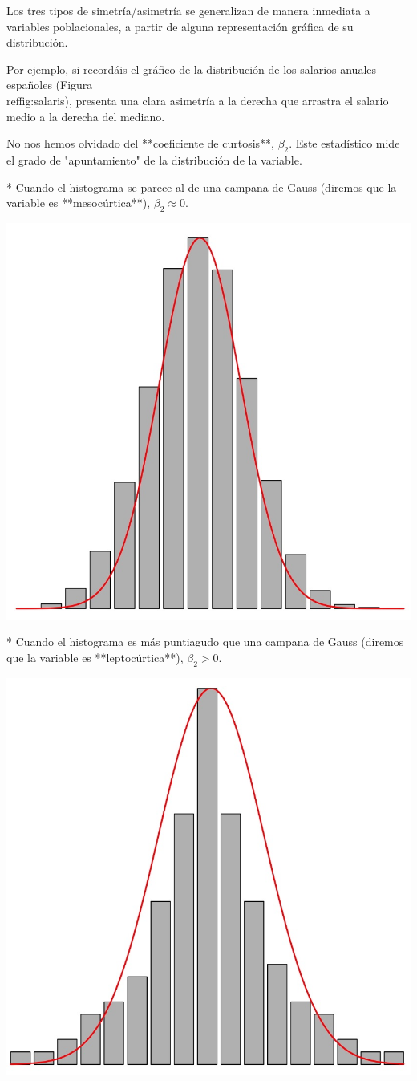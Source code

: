 \documentclass[
]{book}
\theoremstyle{definition}
\theoremstyle{definition}
\theoremstyle{definition}
\theoremstyle{definition}
\theoremstyle{remark}
\begin{document}
\begin{rmdnote}
Los tres tipos de simetría/asimetría se generalizan de manera inmediata a variables poblacionales, a partir de alguna representación gráfica de su distribución.

Por ejemplo, si recordáis el gráfico de la distribución de los salarios anuales españoles (Figura \\ref{fig:salaris}), presenta una clara asimetría a la derecha que arrastra el salario medio a la derecha del mediano.
\end{rmdnote}


No nos hemos olvidado del **coeficiente de curtosis**, $\beta_2$. Este estadístico mide el grado de "apuntamiento" de la distribución de la variable.

* Cuando el histograma se parece al de una campana de Gauss (diremos que la variable es **mesocúrtica**), $\beta_2\approx 0$.



\begin{center}\includegraphics[width=0.6\linewidth]{INREMDN_files/figure-html/Meso} \end{center}

* Cuando el histograma es más puntiagudo que una campana de Gauss (diremos que la variable es **leptocúrtica**), $\beta_2> 0$.


\begin{center}\includegraphics[width=0.6\linewidth]{INREMDN_files/figure-html/Lepto} \end{center}
\end{document}
